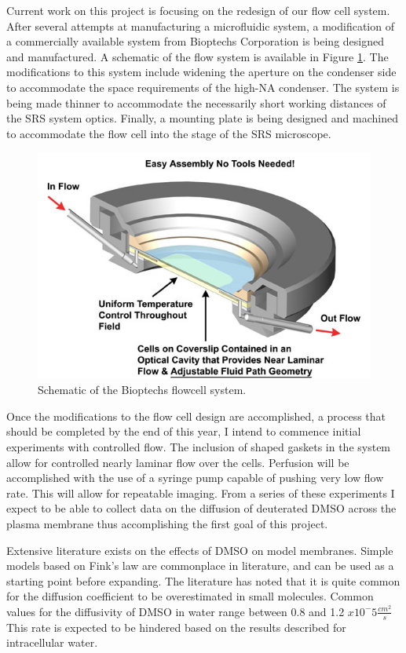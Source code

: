 Current work on this project is focusing on the redesign of our flow cell system.  After several attempts at manufacturing a microfluidic system, a modification of a commercially available system from Bioptechs Corporation is being designed and manufactured. A schematic of the flow system is available in Figure \ref{fig:flowcell}.  The modifications to this system include widening the aperture on the condenser side to accommodate the space requirements of the high-NA condenser.  The system is being made thinner to accommodate the necessarily short working distances of the SRS system optics. Finally, a mounting plate is being designed and machined to accommodate the flow cell into the stage of the SRS microscope.   

\begin{figure}
    \centering
    \includegraphics[width=.5\linewidth]{Figures/flowcell.jpg}
    \caption{Schematic of the Bioptechs flowcell system.}
    \label{fig:flowcell}
\end{figure}

Once the modifications to the flow cell design are accomplished, a process that should be completed by the end of this year, I intend to commence initial experiments with controlled flow.  The inclusion of shaped gaskets in the system allow for controlled nearly laminar flow over the cells.  Perfusion will be accomplished with the use of a syringe pump capable of pushing very low flow rate.  This will allow for repeatable imaging.  From a series of these experiments I expect to be able to collect data on the diffusion of deuterated DMSO across the plasma membrane thus accomplishing the first goal of this project.  

Extensive literature exists on the effects of DMSO on model membranes.\cite{ANCHORDOGUY1992117, GORDELIY19982343} Simple models based on Fink's law are commonplace in literature, and can be used as a starting point before expanding.\cite{LEEKUMJORN20061751} The literature has noted that it is quite common for the diffusion coefficient to be overestimated in small molecules.\cite{Evans:2018aa}  Common values for the diffusivity of DMSO in water range between 0.8 and 1.2 $x 10^-5 \frac{cm^2}{s}$\cite{IECR1992, doi:10.1002/cphc.201500670}  This rate is expected to be hindered based on the results described for intracellular water.

